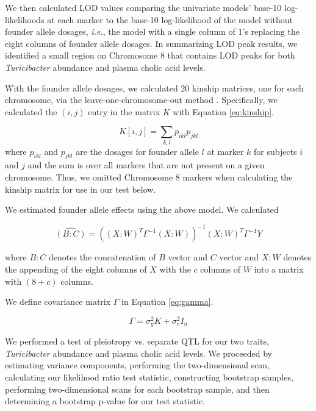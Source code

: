 \documentclass[oneside]{book}
\begin{document}
We then calculated LOD values comparing the univariate models' base-10 log-likelihoods  at each marker to the base-10 log-likelihood of the model without founder allele dosages, \emph{i.e.}, the model with a single column of $1$'s replacing the eight columns of founder allele dosages. In summarizing LOD peak results, we identified a small region on Chromosome 8 that contains LOD peaks for both \emph{Turicibacter} abundance and plasma cholic acid levels.


With the founder allele dosages, we calculated 20 kinship matrices, one for each chromosome, via the leave-one-chromosome-out method \citep{yang2014advantages}. Specifically, we calculated the $(i, j)$ entry in the matrix $K$ with Equation \ref{eq:kinship}.

\begin{equation}
K[i, j] = \sum_{k,l}p_{ikl}p_{jkl}
\label{eq:kinship}
\end{equation}
where $p_{ikl}$ and $p_{jkl}$ are the dosages for founder allele $l$ at marker $k$ for subjects $i$ and $j$ and the sum is over all markers that are not present on a given chromosome. Thus, we omitted Chromosome 8 markers when calculating the kinship matrix for use in our test below. 



We estimated founder allele effects using the above model. We calculated

\begin{equation}
\widehat{(B:C)} = \left((X:W)^T\Gamma^{-1}(X:W)\right)^{-1}(X:W)^T\Gamma^{-1}Y
\label{eq:allele-effects}
\end{equation}

where $B:C$ denotes the concatenation of $B$ vector and $C$ vector and $X:W$ denotes the appending of the eight columns of $X$ with the $c$ columns of $W$ into a matrix with $(8 + c)$ columns. 

We define covariance matrix $\Gamma$ in Equation \ref{eq:gamma}.

\begin{equation}
\Gamma = \sigma^2_g K + \sigma^2_e I_n
\label{eq:gamma}
\end{equation}


We performed a test of pleiotropy vs. separate QTL for our two traits, \emph{Turicibacter} abundance and plasma cholic acid levels. We proceeded by estimating variance components, performing the two-dimensional scan, calculating our likelihood ratio test statistic, constructing bootstrap samples, performing two-dimensional scans for each bootstrap sample, and then determining a bootstrap p-value for our test statistic.
\end{document}
